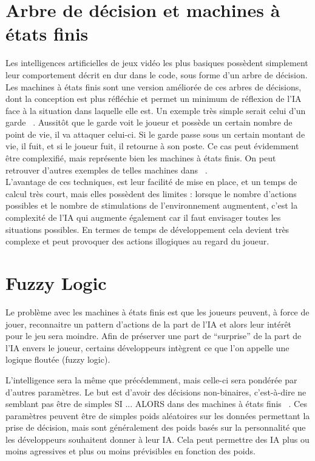 \documentclass[asi]{picINSAIA}
\begin{document}
\section{Arbre de décision et machines à états finis}
Les intelligences artificielles de jeux vidéo les plus basiques possèdent simplement leur comportement décrit en dur dans le code, sous forme d’un arbre de décision. \\
Les machines à états finis sont une version améliorée de ces arbres de décisions, dont la conception est plus réfléchie et permet un minimum de réflexion de l'IA face à la situation dans laquelle elle est. Un exemple très simple serait celui d'un garde ~\cite{MindGames}. Aussitôt que le garde voit le joueur et possède un certain nombre de point de vie, il va attaquer celui-ci. Si le garde passe sous un certain montant de vie, il fuit, et si le joueur fuit, il retourne à son poste. Ce cas peut évidemment être complexifié, mais représente bien les machines à états finis. On peut retrouver d'autres exemples de telles machines dans ~\cite{khoo2002applying}.\\

L'avantage de ces techniques, est leur facilité de mise en place, et un temps de calcul très court, mais elles possèdent des limites : lorsque le nombre d’actions possibles et le nombre de stimulations de l’environnement augmentent, c’est la complexité de l’IA qui augmente également car il faut envisager toutes les situations possibles. En termes de temps de développement cela devient très complexe et peut provoquer des actions illogiques au regard du joueur.

\section{Fuzzy Logic}
Le problème avec les machines à états finis est que les joueurs peuvent, à force de jouer, reconnaitre un pattern d'actions de la part de l'IA et alors leur intérêt pour le jeu sera moindre. Afin de préserver une part de ``surprise'' de la part de l'IA envers le joueur, certains développeurs intègrent ce que l'on appelle une logique floutée (fuzzy logic).

L'intelligence sera la même que précédemment, mais celle-ci sera pondérée par d'autres paramètres. Le but est d'avoir des décisions non-binaires, c'est-à-dire ne semblant pas être de simples SI ... ALORS dans des machines à états finis ~\cite{CompGamesWithIntel}.
Ces paramètres peuvent être de simples poids aléatoires sur les données permettant la prise de décision, mais sont généralement des poids basés sur la personnalité que les développeurs souhaitent donner à leur IA. Cela peut permettre des IA plus ou moins agressives et plus ou moins prévisibles en fonction des poids.\\
\end{document}
